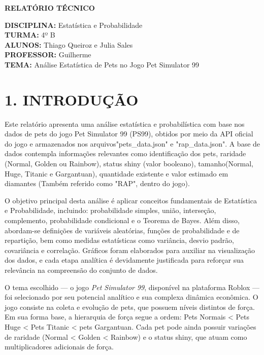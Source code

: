 \documentclass[12pt]{article}
\begin{document}
\begin{center}
\textbf{RELATÓRIO TÉCNICO}
\end{center}

\noindent\textbf{DISCIPLINA:} Estatística e Probabilidade \\
\noindent\textbf{TURMA:} 4º B \\
\noindent\textbf{ALUNOS:} Thiago Queiroz e Julia Sales \\
\noindent\textbf{PROFESSOR:} Guilherme \\
\noindent\textbf{TEMA:} Análise Estatística de Pets no Jogo Pet Simulator 99 \\

\doublespacing

\section*{1. INTRODUÇÃO}

Este relatório apresenta uma análise estatística e probabilística com base nos dados de pets do jogo Pet Simulator 99 (PS99), obtidos por meio da API oficial do jogo e armazenados nos arquivos"pets\_data.json" e "rap\_data.json". A base de dados contempla informações relevantes como identificação dos pets, raridade (Normal, Golden ou Rainbow), status shiny (valor booleano), tamanho(Normal, Huge, Titanic e Gargantuan), quantidade existente e valor estimado em diamantes (Também referido como "RAP", dentro do jogo).

O objetivo principal desta análise é aplicar conceitos fundamentais de Estatística e Probabilidade, incluindo: probabilidade simples, união, interseção, complemento, probabilidade condicional e o Teorema de Bayes. Além disso, abordam-se definições de variáveis aleatórias, funções de probabilidade e de repartição, bem como medidas estatísticas como variância, desvio padrão, covariância e correlação. Gráficos foram elaborados para auxiliar na visualização dos dados, e cada etapa analítica é devidamente justificada para reforçar sua relevância na compreensão do conjunto de dados.

O tema escolhido — o jogo \textit{Pet Simulator 99}, disponível na plataforma Roblox — foi selecionado por seu potencial analítico e sua complexa dinâmica econômica. O jogo consiste na coleta e evolução de pets, que possuem níveis distintos de força. Em sua forma base, a hierarquia de força segue a ordem: Pets Normais \textless{} Pets Huge \textless{} Pets Titanic \textless{} pets Gargantuan. Cada pet pode ainda possuir variações de raridade (Normal \textless{} Golden \textless{} Rainbow) e o status shiny, que atuam como multiplicadores adicionais de força.
\end{document}
